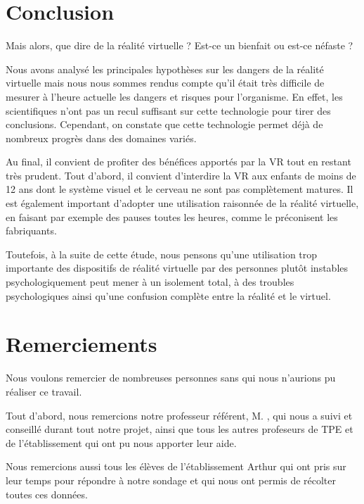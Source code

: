 \documentclass[12pt, a4paper]{report}
\begin{document}
\appendix


\chapter*{Conclusion}

Mais alors, que dire de la réalité virtuelle ? Est-ce un bienfait ou est-ce néfaste ?

Nous avons analysé les principales hypothèses sur les dangers de la réalité virtuelle mais nous nous sommes rendus compte qu'il était très difficile de mesurer à l'heure actuelle les dangers et risques pour l'organisme. En effet, les scientifiques n'ont pas un recul suffisant sur cette technologie pour tirer des conclusions. Cependant, on constate que cette technologie permet déjà de nombreux progrès dans des domaines variés.

Au final, il convient de profiter des bénéfices apportés par la VR tout en restant très prudent. Tout d'abord, il convient d'interdire la VR aux enfants de moins de 12 ans dont le système visuel et le cerveau ne sont pas complètement matures. Il est également important d'adopter une utilisation raisonnée de la réalité virtuelle, en faisant par exemple des pauses toutes les heures, comme le préconisent les fabriquants.

Toutefois, à la suite de cette étude, nous pensons qu'une utilisation trop importante des dispositifs de réalité virtuelle par des personnes plutôt instables psychologiquement peut mener à un isolement total, à des troubles psychologiques ainsi qu'une confusion complète entre la réalité et le virtuel.

\chapter*{Remerciements}

Nous voulons remercier de nombreuses personnes sans qui nous n'aurions pu réaliser ce travail.

Tout d'abord, nous remercions notre professeur référent, M. , qui nous a suivi et conseillé durant tout notre projet, ainsi que tous les autres profeseurs de TPE et de l'établissement qui ont pu nous apporter leur aide.

Nous remercions aussi tous les élèves de l'établissement Arthur  qui ont pris sur leur temps pour répondre à notre sondage et qui nous ont permis de récolter toutes ces données.
\end{document}
